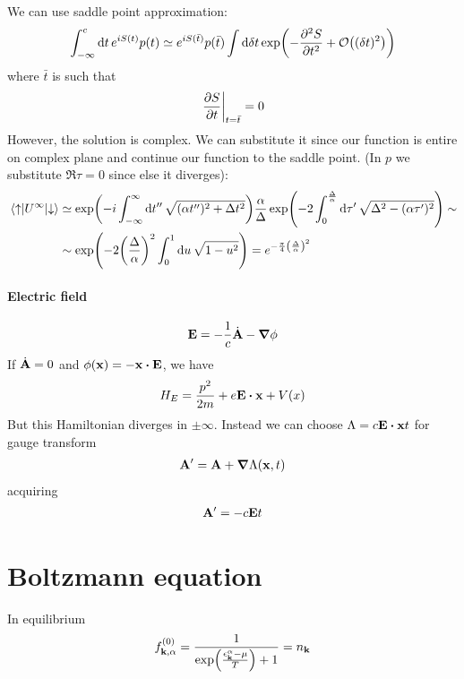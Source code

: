 We can use saddle point approximation:
\begin{align}
\int_{-\infty}^c \dd{t} e^{i S(t)} p(t) \simeq e^{i S(\bar{t})} p(\bar{t}) \int \dd{\delta t} \exp( -\pdv[2]{S}{t} (\delta t) + \order{(\delta t)^2} )
\end{align}
where $\bar{t}$ is such that
\begin{align}
\eval{\pdv{S}{t}}_{t=\bar{t}}=0
\end{align}
However, the solution is complex. We can substitute it since our function is entire on complex plane and continue our function to the saddle point. (In $p$ we substitute $\Re{\tau} = 0$ since else it diverges):
\begin{align}
\mel{\uparrow}{U^\infty}{\downarrow} &\simeq  
\exp(-i \int_{-\infty}^\infty \dd{t''} \sqrt{(\alpha t'')^2+\Delta t^2}) \frac{\alpha}{\Delta} \exp(-2\int_0^{\frac{\Delta}{\alpha}} \dd{\tau'} \sqrt{\Delta^2 - (\alpha \tau')^2}) \sim\\&\sim \exp(-2 \qty(\frac{\Delta}{\alpha})^2 \int_0^1 \dd{u} \sqrt{1-u^2}) = e^{-\frac{\pi}{4} \qty(\frac{\Delta}{\alpha})^2}
\end{align}
\paragraph{Electric field}
\begin{align}
\vb{E} = -\frac{1}{c}\dot{\vb{A}}  - \grad{\phi}
\end{align}
If $\dot{\vb{A}} =0 $ and $\phi(\vb{x}) = -\vb{x}\vdot \vb{E}$, we have
\begin{align}
H_E = \frac{p^2}{2m} + e\vb{E} \vdot \vb{x} + V(x)
\end{align} 
But this Hamiltonian diverges in $\pm \infty$. Instead we can choose $\Lambda = c\vb{E} \vdot \vb{x}t$ for gauge transform
\begin{align}
\vb{A}' = \vb{A} + \grad{\Lambda(\vb{x},t)}
\end{align} 
acquiring 
\begin{align}
\vb{A}' = -c\vb{E} t
\end{align}
\section{Boltzmann equation}
In equilibrium
\begin{align}
f^{(0)}_{\vb{k}, \alpha} = \frac{1}{\exp(\frac{\epsilon_{\vb{k}}^\alpha-\mu}{T})+1} = n_{\vb{k}}
\end{align}

